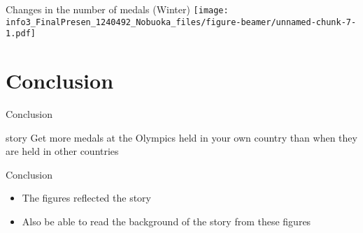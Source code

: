 \documentclass[
  ignorenonframetext,
  unicode]{beamer}
\begin{document}
\begin{frame}{Changes in the number of medals (Winter)}
\protect\hypertarget{changes-in-the-number-of-medals-winter}{}
\texttt{[image: info3\_FinalPresen\_1240492\_Nobuoka\_files/figure-beamer/unnamed-chunk-7-1.pdf]}
\end{frame}

\hypertarget{conclusion}{%
\section{Conclusion}\label{conclusion}}

\begin{frame}{Conclusion}
\protect\hypertarget{conclusion-1}{}
\begin{alertblock}{story}
 Get more medals at the Olympics held in your own country than when they are held in other countries
\end{alertblock}

\begin{block}{Conclusion}
 \begin{itemize}
   \item The figures reflected the story
   \item Also be able to read the background of the story from these figures
 \end{itemize}
\end{block}
\end{frame}
\end{document}
